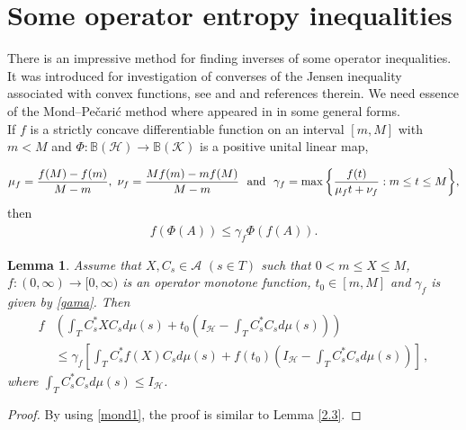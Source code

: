 \documentclass[12pt, reqno]{amsart}
\newtheorem{lemma}[theorem]{Lemma}
\theoremstyle{definition}
\theoremstyle{remark}
\numberwithin{equation}{section}
\begin{document}
\section{Some  operator entropy inequalities}
There is an impressive method for finding inverses of some operator inequalities. It was introduced for investigation of converses of the Jensen inequality associated with convex functions, see \cite{FMPS} and \cite{MT} and references therein. We need  essence of the Mond--Pe\v{c}ari\'c method where appeared in \cite[Chapter 2]{FMPS} in some general forms.\\
If $f$ is a strictly  concave differentiable function on an interval $[m,M]$ with $m<M$ and  $\Phi:\mathbb{B}(\mathscr{H})\longrightarrow\mathbb{B}(\mathscr{K})$ is a positive unital linear map,

{\footnotesize\begin{eqnarray}\label{gama}
\mu_f=\frac{f(M)-f(m)}{M-m},\,\, \nu_f=\frac{Mf(m)-mf(M)}{M-m}\,\,{\rm~and~}\,\,\gamma_f=\displaystyle{\max\left\{\frac{f(t)}{\mu_f t+\nu_f}: m\leq t\leq M\right\}},
\end{eqnarray}}
  then
\begin{eqnarray}\label{mond1}
f(\Phi(A))\leq\gamma_f \Phi(f(A)).
\end{eqnarray}

\begin{lemma}\label{reverses1}
Assume that $X,C_s\in\mathscr{A}\,\,(s\in T)$ such that $0<m\leq X \leq M$, $f:(0,\infty) \to [0,\infty)$ is an operator monotone function, $t_0\in[m,M]$ and $\gamma_f$ is given by \eqref{gama}.
 Then
\begin{align*}
f & \left(\int_TC_s^*XC_sd\mu(s)+t_0\left(I_{\mathscr H}-\int_TC_s^*C_sd\mu(s)\right)\right)\\
& \leq \gamma_f\left[\int_TC_s^*f(X)C_sd\mu(s)+f(t_0)\left(I_{\mathscr H}-\int_TC_s^*C_sd\mu(s)\right)\right]\,,
\end{align*}
where  $\int_TC_s^*C_sd\mu(s)\leq I_{\mathscr H}$.
\end{lemma}
\begin{proof}
By using \eqref{mond1}, the proof is similar to Lemma \ref{2.3}.
\end{proof}
\end{document}
